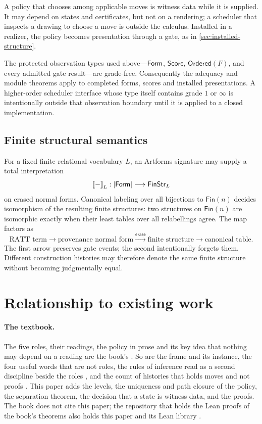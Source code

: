 \documentclass[11pt]{article}
\numberwithin{equation}{section}
\theoremstyle{definition}
\theoremstyle{plain}
\theoremstyle{remark}
\renewcommand{\Form}{\AFForm}
\newcommand{\erase}{\mathsf{erase}}
\newcommand{\absent}{\boldsymbol\infty}
\newcommand{\sem}[1]{\left\lbrack\!\left\lbrack #1\right\rbrack\!\right\rbrack}
\newcommand{\fin}{\mathsf{Fin}}
\begin{document}
A policy that chooses among applicable moves is witness data while it is
supplied.  It may depend on states and certificates, but not on a rendering;
a scheduler that inspects a drawing to choose a move is outside the calculus.
Installed in a realizer, the policy becomes presentation through a gate, as
in \cref{sec:installed-structure}.

The protected observation types used above---\(\Form\), \(\mathsf{Score}\),
\(\mathsf{Ordered}(F)\), and every admitted gate result---are grade-free.
Consequently the adequacy and module theorems apply to completed forms,
scores and installed presentations.  A higher-order scheduler interface whose
type itself contains grade \(1\) or \(\absent\) is intentionally outside that
observation boundary until it is applied to a closed implementation.

\subsection{Finite structural semantics}\label{sec:finite-semantics}

For a fixed finite relational vocabulary \(L\), an Artforms signature may
supply a total interpretation
\[
  \sem{-}_L:
  |\Form|\longrightarrow\mathsf{FinStr}_L
\]
on erased normal forms.  Canonical labeling over all bijections to
\(\fin(n)\) decides isomorphism of the resulting finite structures: two
structures on \(\fin(n)\) are isomorphic exactly when their least tables over
all relabellings agree.  The map factors as
\[
 \text{RATT term}
 \longrightarrow
 \text{provenance normal form}
 \xrightarrow{\erase}
 \text{finite structure}
 \longrightarrow
 \text{canonical table}.
\]
The first arrow preserves gate events; the second intentionally forgets them.
Different construction histories may therefore denote the same finite
structure without becoming judgmentally equal.

\section{Relationship to existing work}\label{sec:related}

\paragraph{The textbook.}
The five roles, their readings, the policy in prose and its key idea that
nothing may depend on a reading are the book's \cite[\S1.9]{Book}.  So are the
frame and its instance, the four useful words that are not roles, the rules of
inference read as a second discipline beside the roles \cite[\S1.11]{Book},
and the count of histories that holds moves and not proofs
\cite[\S7.4]{Book}.  This paper adds the levels, the uniqueness and path
closure of the policy, the separation theorem, the decision that a state is
witness data, and the proofs.  The book does not cite this paper; the
repository that holds the Lean proofs of the book's theorems also holds this
paper and its Lean library \cite{Repo}.
\end{document}
